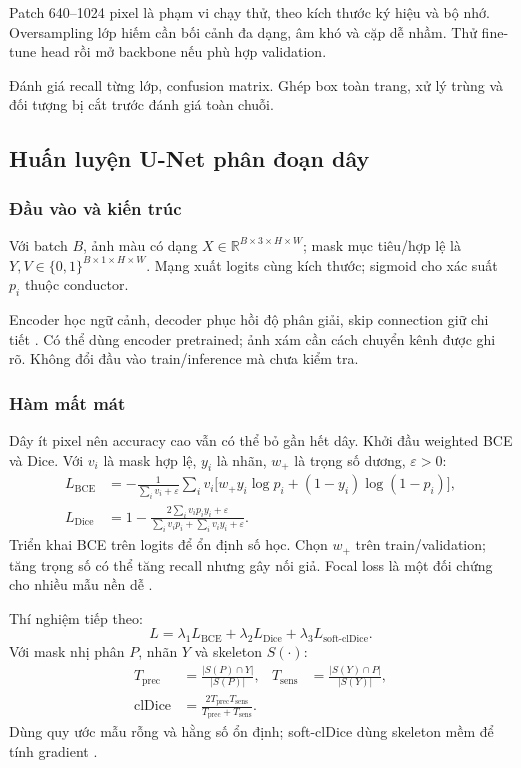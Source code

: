 \documentclass[11pt,a4paper]{article}
\begin{document}
Patch 640--1024 pixel là phạm vi chạy thử, theo kích thước ký hiệu và bộ nhớ. Oversampling lớp hiếm cần bối cảnh đa dạng, âm khó và cặp dễ nhầm. Thử fine-tune head rồi mở backbone nếu phù hợp validation.

Đánh giá recall từng lớp, confusion matrix. Ghép box toàn trang, xử lý trùng và đối tượng bị cắt trước đánh giá toàn chuỗi.

\subsection{Huấn luyện U-Net phân đoạn dây}
\subsubsection{Đầu vào và kiến trúc}
Với batch $B$, ảnh màu có dạng $X\in\mathbb{R}^{B\times3\times H\times W}$; mask mục tiêu/hợp lệ là $Y,V\in\{0,1\}^{B\times1\times H\times W}$. Mạng xuất logits cùng kích thước; sigmoid cho xác suất $p_i$ thuộc conductor.

Encoder học ngữ cảnh, decoder phục hồi độ phân giải, skip connection giữ chi tiết \cite{unet}. Có thể dùng encoder pretrained; ảnh xám cần cách chuyển kênh được ghi rõ. Không đổi đầu vào train/inference mà chưa kiểm tra.

\subsubsection{Hàm mất mát}
Dây ít pixel nên accuracy cao vẫn có thể bỏ gần hết dây. Khởi đầu weighted BCE và Dice. Với $v_i$ là mask hợp lệ, $y_i$ là nhãn, $w_+$ là trọng số dương, $\varepsilon>0$:
\begin{align}
L_{\mathrm{BCE}}&=-\frac{1}{\sum_i v_i+\varepsilon}
  \sum_i v_i\bigl[w_+y_i\log p_i+(1-y_i)\log(1-p_i)\bigr],\\
L_{\mathrm{Dice}}&=1-\frac{2\sum_i v_i p_i y_i+\varepsilon}
  {\sum_i v_i p_i+\sum_i v_i y_i+\varepsilon}.
\end{align}
Triển khai BCE trên logits để ổn định số học. Chọn $w_+$ trên train/validation; tăng trọng số có thể tăng recall nhưng gây nối giả. Focal loss là một đối chứng cho nhiều mẫu nền dễ \cite{focal}.

Thí nghiệm tiếp theo:
\begin{equation}
L=\lambda_1L_{\mathrm{BCE}}+\lambda_2L_{\mathrm{Dice}}+
  \lambda_3L_{\mathrm{soft\text{-}clDice}}.
\end{equation}
Với mask nhị phân $P$, nhãn $Y$ và skeleton $S(\cdot)$:
\begin{align}
T_{\mathrm{prec}}&=\frac{|S(P)\cap Y|}{|S(P)|},&
T_{\mathrm{sens}}&=\frac{|S(Y)\cap P|}{|S(Y)|},\\
\mathrm{clDice}&=\frac{2T_{\mathrm{prec}}T_{\mathrm{sens}}}
{T_{\mathrm{prec}}+T_{\mathrm{sens}}}.
\end{align}
Dùng quy ước mẫu rỗng và hằng số ổn định; soft-clDice dùng skeleton mềm để tính gradient \cite{cldice}.
\end{document}
